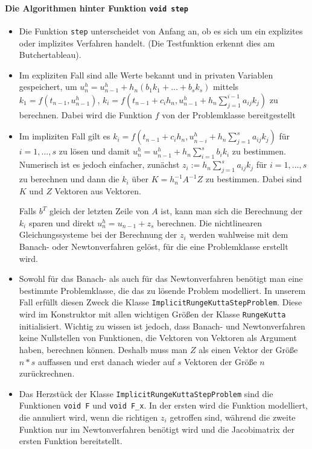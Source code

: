 \documentclass[a4paper,11pt]{article}
\theoremstyle{definition}
\begin{document}
\paragraph{Die Algorithmen hinter Funktion \lstinline{void step}}
\begin{itemize}
\item Die Funktion \lstinline{step} unterscheidet von Anfang an, ob es
  sich um ein explizites oder implizites Verfahren handelt. (Die
  Testfunktion erkennt dies am Butchertableau).
\item Im expliziten Fall sind alle Werte bekannt und in privaten
  Variablen gespeichert, um
  $u_{n}^h = u_{n-1}^h +h_n(b_1k_1+...+b_sk_s)$ mittels
  $k_1 = f(t_{n-1},u_{n-1}^h)$,
  $k_i = f(t_{n-1}+c_ih_n, u_{n-1}^h+h_n \sum_{j=1}^{i-1}a_{ij}k_j)$
  zu berechnen. Dabei wird die Funktion $f$ von der Problemklasse
  bereitgestellt

\item Im impliziten Fall gilt es $k_i = f(t_{n-1}+c_ih_n,
  u_{n-i}^h+h_n \sum_{j=1}^s a_{ij}k_j)$ für $i = 1,...,s$ zu lösen
  und damit $u_n^h = u_{n-1}^h + h_n \sum_{i = 1}^s b_ik_i $ zu
  bestimmen. Numerisch ist es jedoch einfacher, zunächst $z_i := h_n
  \sum_{j=1}^s a_{ij}k_j$ für $i = 1,...,s$ zu berechnen und dann die
  $k_i$ über $K= h_n^{-1}A^{-1}Z$ zu bestimmen. Dabei sind $K$ und $Z$
  Vektoren aus Vektoren.

  Falls $b^T$ gleich der letzten Zeile von $A$ ist, kann man sich die
  Berechnung der $k_i$ sparen und direkt $u_n^h = u_{n-1}+z_s$
  berechnen. Die nichtlinearen Gleichungssysteme bei der Berechnung
  der $z_i$ werden wahlweise mit dem Banach- oder Newtonverfahren
  gelöst, für die eine Problemklasse erstellt wird.

\item Sowohl für das Banach- als auch für das Newtonverfahren benötigt
  man eine bestimmte Problemklasse, die das zu lösende Problem
  modelliert. In unserem Fall erfüllt diesen Zweck die Klasse
  \lstinline{ImplicitRungeKuttaStepProblem}. Diese wird im Konstruktor
  mit allen wichtigen Größen der Klasse \lstinline{RungeKutta}
  initialisiert. Wichtig zu wissen ist jedoch, dass Banach- und
  Newtonverfahren keine Nullstellen von Funktionen, die Vektoren von
  Vektoren als Argument haben, berechnen können. Deshalb muss man $Z$
  als einen Vektor der Größe $n*s$ auffassen und erst danach wieder
  auf $s$ Vektoren der Größe $n$ zurückrechnen.

\item Das Herzstück der Klasse
  \lstinline{ImplicitRungeKuttaStepProblem} sind die Funktionen
  \lstinline{void F} und \lstinline{void F_x}. In der ersten wird die
  Funktion modelliert, die annuliert wird, wenn die richtigen $z_i$
  getroffen sind, während die zweite Funktion nur im Newtonverfahren
  benötigt wird und die Jacobimatrix der ersten Funktion bereitstellt.


\end{itemize}
\end{document}

